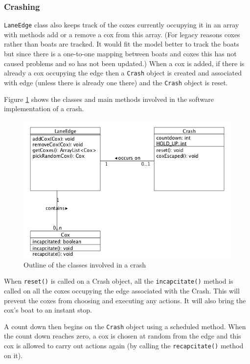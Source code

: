 \subsubsection{Crashing}

\texttt{LaneEdge} class also keeps track of the coxes currently occupying it
in an array with methods add or a remove a cox from this array. (For
legacy reasons coxes rather than boats are tracked. It would fit the
model better to track the boats but since there is a one-to-one
mapping between boats and coxes this has not caused problems and so
has not been updated.) When a
cox is added, if there is already a cox occupying the edge then a
\texttt{Crash} object is created and associated with edge (unless there is
already one there) and the \texttt{Crash} object is reset.

Figure \ref{software:fig:crashingUML} shows the classes and main methods involved in the software implementation of a crash.

\begin{figure}
\begin{center}
  \includegraphics[scale=0.3]{images/crashing.png}
  \caption{Outline of the classes involved in a crash}
  \label{software:fig:crashingUML}
\end{center}
\end{figure}


When \texttt{reset()} is called on a Crash object, all the
\texttt{incapcitate()} method is called on all the coxes
occupying the edge associated with the Crash. This will prevent the
coxes from choosing and executing any actions. It will also bring the
cox's boat to an instant stop.

A count down then begins on the \texttt{Crash} object using a
scheduled method. When the count down reaches zero, a cox is chosen at
random from the edge and this cox is allowed to carry out actions
again (by calling the \texttt{recapcitate()} method on it).

